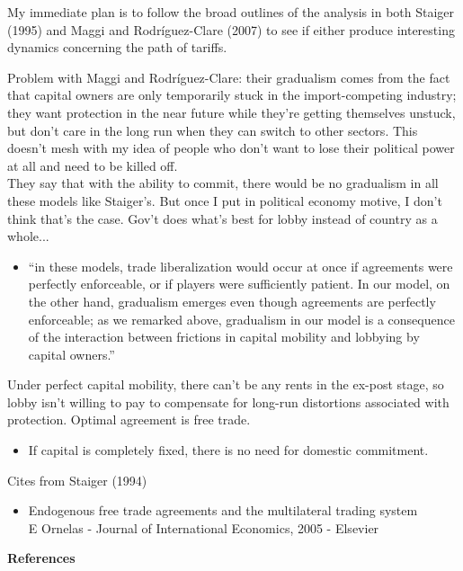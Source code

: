 \documentclass[12pt]{article}
\begin{document}
My immediate plan is to follow the broad outlines of the analysis in both Staiger (1995) and Maggi and Rodr\'{i}guez-Clare (2007) to see if either produce interesting dynamics concerning the path of tariffs.


\newpage
Problem with Maggi and Rodr\'{i}guez-Clare: their gradualism comes from the fact that capital owners are only temporarily stuck in the import-competing industry; they want protection in the near future while they're getting themselves unstuck, but don't care in the long run when they can switch to other sectors. This doesn't mesh with my idea of people who don't want to lose their political power at all and need to be killed off. \\

They say that with the ability to commit, there would be no gradualism in all these models like Staiger's. But once I put in political economy motive, I don't think that's the case. Gov't does what's best for lobby instead of country as a whole...
\begin{itemize}
	\item ``in these models, trade liberalization would occur at once if agreements were perfectly enforceable, or if players were sufficiently patient. In our model, on the other hand, gradualism emerges even though agreements are perfectly enforceable; as we remarked above, gradualism in our model is a consequence of the interaction
between frictions in capital mobility and lobbying by capital owners.''
\end{itemize}

Under perfect capital mobility, there can't be any rents in the ex-post stage, so lobby isn't willing to pay to compensate for long-run distortions associated with protection. Optimal agreement is free trade.
\begin{itemize}
	\item If capital is completely fixed, there is no need for domestic commitment.
\end{itemize}

Cites from Staiger (1994)
\begin{itemize}
	\item Endogenous free trade agreements and the multilateral trading system \\
E Ornelas - Journal of International Economics, 2005 - Elsevier
\end{itemize}

\newpage
\noindent\large\textbf{References}\\
\end{document}
